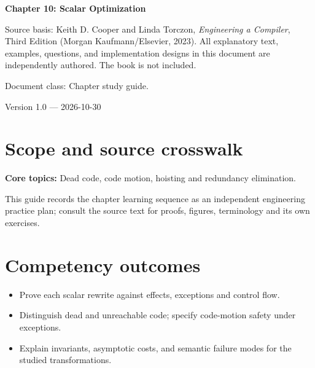 \documentclass[10pt,letterpaper]{article}
\begin{document}
\begin{titlepage}
\centering\vspace*{1.0in}
{\Huge\bfseries\textcolor{CompilerBlue}{Chapter 10: Scalar Optimization}\par}
\vspace{.22in}{\Large Critical reading, original exercises, evidence and review\par}
\vspace{.4in}{\large Compiler Engineering Documentation Suite\par}
\vfill
\begin{minipage}{.86\linewidth}\small
Source basis: Keith D. Cooper and Linda Torczon, \emph{Engineering a Compiler}, Third Edition (Morgan Kaufmann/Elsevier, 2023). All explanatory text, examples, questions, and implementation designs in this document are independently authored. The book is not included.\par\medskip
Document class: Chapter study guide.
\end{minipage}
\vfill\textcolor{CompilerGray}{Version 1.0 --- 2026-10-30}\par
\end{titlepage}
\tableofcontents\clearpage
\section{Scope and source crosswalk}
\textbf{Core topics:} Dead code, code motion, hoisting and redundancy elimination.

This guide records the chapter learning sequence as an independent engineering practice plan; consult the source text for proofs, figures, terminology and its own exercises.

\section{Competency outcomes}
\begin{itemize}
\item Prove each scalar rewrite against effects, exceptions and control flow.
\item Distinguish dead and unreachable code; specify code-motion safety under exceptions.
\item Explain invariants, asymptotic costs, and semantic failure modes for the studied transformations.
\end{itemize}
\end{document}
